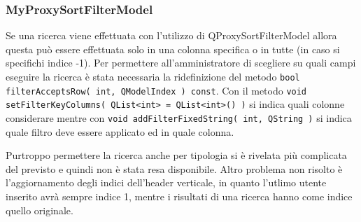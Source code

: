 \documentclass[a4paper]{article}
\begin{document}
\subsubsection*{MyProxySortFilterModel}
Se una ricerca viene effettuata con l'utilizzo di QProxySortFilterModel allora questa può essere effettuata solo in una colonna specifica o in tutte (in caso si specifichi indice -1). Per permettere all'amministratore di scegliere su quali campi eseguire la ricerca è stata necessaria la ridefinizione del metodo \texttt{bool filterAcceptsRow( int, QModelIndex ) const}. Con il metodo \texttt{void setFilterKeyColumns( QList<int> = QList<int>() )} si indica quali colonne considerare mentre con \texttt{void addFilterFixedString( int, QString )} si indica quale filtro deve essere applicato ed in quale colonna.

Purtroppo permettere la ricerca anche per tipologia si è rivelata più complicata del previsto e quindi non è stata resa disponibile. Altro problema non risolto è l'aggiornamento degli indici dell'header verticale, in quanto l'utlimo utente inserito avrà sempre indice 1, mentre i risultati di una ricerca hanno come indice quello originale.
\end{document}
